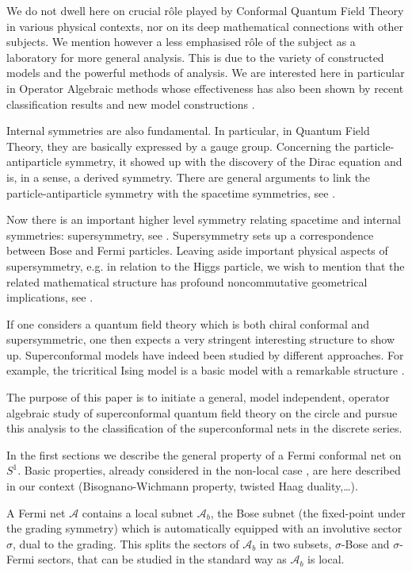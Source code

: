 \documentclass[11pt]{article}
\def\A{{\cal A}}
\def\s{{\sigma}}
\def\A{{\mathcal A}}
\begin{document}
We do not dwell here on crucial r\^ole played by Conformal Quantum Field Theory in various physical contexts, nor on its deep mathematical connections with other subjects.
We mention however a less emphasised r\^ole of the subject as a laboratory for more general analysis. This is due to the variety of constructed models and the powerful methods of analysis. We are interested here in particular in Operator Algebraic methods whose effectiveness has  also been shown by recent classification results and new model constructions \cite{KL1,KLPR,X6}.

Internal symmetries are also fundamental. In particular, in Quantum Field Theory, they are basically expressed by a gauge group. Concerning the particle-antiparticle symmetry, it showed up with the discovery of the Dirac equation and is, in a sense, a derived symmetry. There are general arguments to link the particle-antiparticle symmetry with the spacetime symmetries, see \cite{GL1}.

Now there is an important higher level symmetry relating spacetime and internal symmetries: supersymmetry, see \cite{WB}. Supersymmetry sets up a correspondence between Bose and Fermi particles. Leaving aside important physical aspects of supersymmetry, e.g. in relation to the Higgs particle, we wish to mention that the related mathematical structure has profound noncommutative geometrical implications, see \cite{C,JLO}.

If one considers a quantum field theory which is both chiral conformal and supersymmetric, one then expects a very stringent interesting structure to show up. Superconformal models have indeed been studied by different approaches. For example, the tricritical Ising model is a basic model with a remarkable structure \cite{FQS}.

The purpose of this paper is to initiate a general, model independent, operator algebraic study of superconformal quantum field theory on the circle and pursue this analysis to the classification of the superconformal nets in the discrete series. 

In the first sections we describe the general property of a Fermi conformal net on $S^1$. Basic properties, already considered in the non-local case \cite{DLR,LR2}, are here described in our context (Bisognano-Wichmann property, twisted Haag duality,\dots).

A Fermi net $\A$ contains a local subnet $\A_b$, the Bose subnet (the fixed-point under the grading symmetry) which is automatically equipped with an involutive sector $\s$, dual to the grading. This splits the sectors of $\A_b$ in two subsets, $\s$-Bose and $\s$-Fermi sectors, that can be studied in the standard way as $\A_b$ is local.
\end{document}
